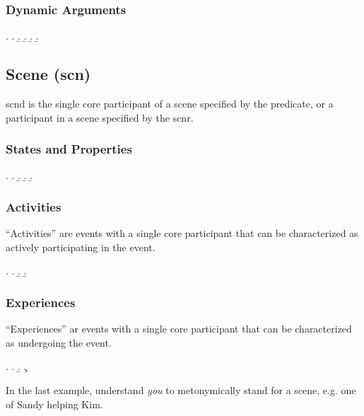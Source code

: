 \documentclass[a4paper]{article}
\begin{document}
\subsubsection{Dynamic Arguments}
\ex. \a. 
     \b. 
     \b. 
     \b. 
     \b. 

\clearpage
\subsection{Scene (\textsf{scn})}
\label{sec:scn}

\textsf{scnd} is the single core participant of a scene specified by the
predicate, or a participant in a scene specified by the \textsf{scnr}.

\subsubsection{States and Properties}

\ex. \a. 
     \b. 
     \b. 
     \b. 

\subsubsection{Activities}

``Activities'' are events with a single core participant that can be
characterized as actively participating in the event.

\ex. \a. 
     \b. 
     \b. 

\subsubsection{Experiences}

``Experiences'' ar events with a single core participant that can be
characterized as undergoing the event.

\ex. \a. 
     \b. 
     \c. 

In the last example, understand \emph{you} to metonymically stand for a scene,
e.g. one of Sandy helping Kim.
\end{document}
